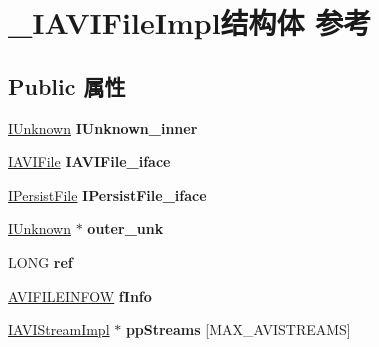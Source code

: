 \hypertarget{struct___i_a_v_i_file_impl}{}\section{\+\_\+\+I\+A\+V\+I\+File\+Impl结构体 参考}
\label{struct___i_a_v_i_file_impl}
\subsection*{Public 属性}
\begin{DoxyCompactItemize}
\item 
\mbox{\label{struct___i_a_v_i_file_impl_a73e6dd2b8489ef28596df81e2a597c8a}} 
\hyperlink{interface_i_unknown}{I\+Unknown} {\bfseries I\+Unknown\+\_\+inner}
\item 
\mbox{\label{struct___i_a_v_i_file_impl_a20bb0eab94b50c82468d21fec5282648}} 
\hyperlink{interface_i_a_v_i_file}{I\+A\+V\+I\+File} {\bfseries I\+A\+V\+I\+File\+\_\+iface}
\item 
\mbox{\label{struct___i_a_v_i_file_impl_a9af830626c987f706344afbaea5401ac}} 
\hyperlink{interface_i_persist_file}{I\+Persist\+File} {\bfseries I\+Persist\+File\+\_\+iface}
\item 
\mbox{\label{struct___i_a_v_i_file_impl_a460f57a7c536c980e461f3a7bd6632cc}} 
\hyperlink{interface_i_unknown}{I\+Unknown} $\ast$ {\bfseries outer\+\_\+unk}
\item 
\mbox{\label{struct___i_a_v_i_file_impl_a98049989d691f889314620cb9f4a0db5}} 
L\+O\+NG {\bfseries ref}
\item 
\mbox{\label{struct___i_a_v_i_file_impl_a18bb3519c0bfd70bc818ab86c03afa11}} 
\hyperlink{struct___a_v_i_f_i_l_e_i_n_f_o_w}{A\+V\+I\+F\+I\+L\+E\+I\+N\+F\+OW} {\bfseries f\+Info}
\item 
\mbox{\label{struct___i_a_v_i_file_impl_ac999524fae366de2e737475122184a19}} 
\hyperlink{struct___i_a_v_i_stream_impl}{I\+A\+V\+I\+Stream\+Impl} $\ast$ {\bfseries pp\+Streams} \mbox{[}M\+A\+X\+\_\+\+A\+V\+I\+S\+T\+R\+E\+A\+MS\mbox{]}

\end{DoxyCompactItemize}
